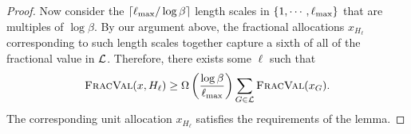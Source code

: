 \begin{proof}
   Now consider the $\lceil{\ell_{\max}}/\log\beta\rceil$ length scales in $\{1, \cdots,
   {\ell_{\max}}\}$ that are multiples of $\log \beta$. By our argument above,
   the fractional allocations $x_{H_\ell}$ corresponding to such
   length scales together capture a sixth of all of the
   fractional value in ${\mathcal{L}}$. Therefore, there exists some $\ell$
   such that 
   \[{\normalfont\textsc{FracVal}}(x,H_\ell)\ge \Omega\left(\frac
     {\log\beta}{{\ell_{\max}}}\right)\sum_{G\in{\mathcal{L}}} {\normalfont\textsc{FracVal}}(x_G).\]
   The corresponding unit allocation $x_{H_\ell}$ satisfies the
   requirements of the lemma.
\end{proof}

